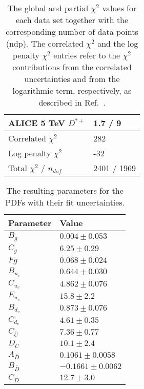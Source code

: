 \begin{table}
\begin{tabular}{ll}
    ALICE 5 TeV $D^{*+}$ & 1.7 / 9  \\ 
    \hline
    Correlated $\chi^2$  & 282  \\ 
    Log penalty $\chi^2$  &  -32  \\ 
    \hline
    Total $\chi^2$ / $n_{dof}$  & 2401 / 1969  \\ 
\end{tabular}
\caption{The global and partial $\chi^2$ values for each data set together with the corresponding number of data points (ndp). The correlated $\chi^2$ and the log penalty $\chi^2$ entries refer to the $\chi^2$ contributions from the correlated uncertainties and from the logarithmic term, respectively, as described in Ref.~\cite{Abramowicz:2015mha}.}
\label{tab:chi}
\end{table}

\begin{table}
    \renewcommand*{\arraystretch}{1.12}
    \centering
\begin{tabular}{ll}
    Parameter & Value \\
    \hline
    $B_g$ & $0.004 \pm 0.053$  \\
    $C_g$ & $6.25 \pm 0.29$  \\
    $Fg$ & $0.068 \pm 0.024$  \\
    $B_{u_v}$ & $0.644 \pm 0.030$  \\
    $C_{u_v}$ & $4.862 \pm 0.076$  \\
    $E_{u_v}$ & $15.8 \pm 2.2$  \\
    $B_{d_v}$ & $0.873 \pm 0.076$  \\
    $C_{d_v}$ & $4.61 \pm 0.35$  \\
    $C_{\overline{U}}$ & $7.36 \pm 0.77$  \\
    $D_{\overline{U}}$ & $10.1 \pm 2.4$  \\
    $A_{\overline{D}}$ & $0.1061 \pm 0.0058$  \\
    $B_{\overline{D}}$ & $-0.1661 \pm 0.0062$  \\
    $C_{\overline{D}}$ & $12.7 \pm 3.0$  \\
\end{tabular}
\caption{The resulting parameters for the PDFs with their fit uncertainties.}
\label{tab:pars}
\end{table}

